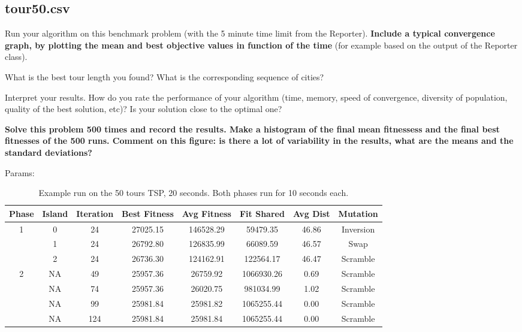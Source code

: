 \documentclass[a4paper,10pt]{article}
\newcommand{\ReplaceMe}[1]{{\color{blue}#1}}
\begin{document}
	



\subsection{tour50.csv}

\ReplaceMe{Run your algorithm on this benchmark problem (with the 5 minute time limit from the Reporter). \textbf{Include a typical convergence graph, by plotting the mean and best objective values in function of the time} (for example based on the output of the Reporter class).

What is the best tour length you found? What is the corresponding sequence of cities?

Interpret your results. How do you rate the performance of your algorithm (time, memory, speed of convergence, diversity of population, quality of the best solution, etc)? Is your solution close to the optimal one?

\textbf{Solve this problem 500 times and record the results. Make a histogram of the final mean fitnessess and the final best fitnesses of the 500 runs. Comment on this figure: is there a lot of variability in the results, what are the means and the standard deviations?}

Params:

	
\begin{table}[ht]
	\centering
	\begin{tabular}{|c|c|c|c|c|c|c|c|}
		\hline
		\textbf{Phase} & \textbf{Island} & \textbf{Iteration} & \textbf{Best Fitness} & \textbf{Avg Fitness} & \textbf{Fit Shared} & \textbf{Avg Dist} & \textbf{Mutation} \\
		\hline
		\multirow{3}{*}{1} & 0 & 24 & 27025.15 & 146528.29 & 59479.35 & 46.86 & Inversion\\
		& 1 & 24 & 26792.80 & 126835.99 & 66089.59 & 46.57 & Swap \\
		& 2 & 24 & 26736.30 & 124162.91 & 122564.17 & 46.47 & Scramble\\
		\hline
		\multirow{4}{*}{2} & NA & 49 & 25957.36 & 26759.92 & 1066930.26 & 0.69 & Scramble\\
		& NA & 74 & 25957.36 & 26020.75 & 981034.99 & 1.02 & Scramble \\
		& NA & 99 & 25981.84 & 25981.82 & 1065255.44 & 0.00 & Scramble\\
		& NA & 124 & 25981.84 & 25981.84 & 1065255.44 & 0.00 & Scramble\\
		\hline
	\end{tabular}
	\caption{Example run on the 50 tours TSP, 20 seconds. Both phases run for 10 seconds each.}
\end{table}
	
	



}
\end{document}
